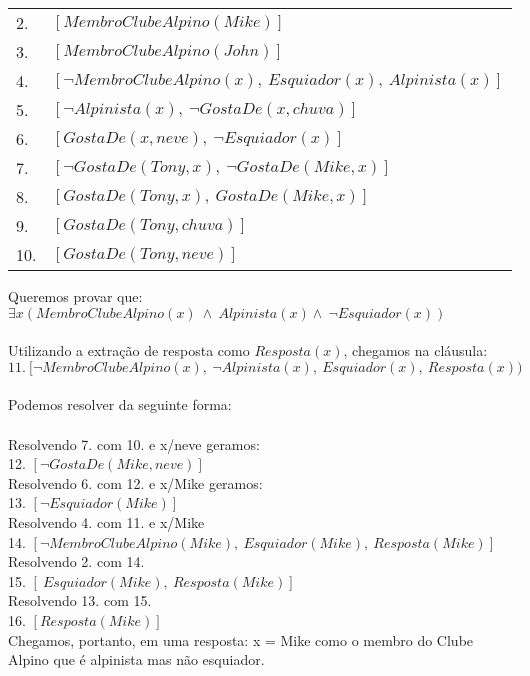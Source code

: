 \documentclass[12pt]{article}
\begin{document}
\begin{itemize}
\begin{itemize}
\begin{center}
\begin{tabular}{l|l}
						2. & $[MembroClubeAlpino(Mike)]$\\
						3. & $[MembroClubeAlpino(John)]$\\
						4. & $[\neg MembroClubeAlpino(x), \ Esquiador(x), \ Alpinista(x)] $ \\
						5. & $[\neg Alpinista(x), \ \neg GostaDe(x, chuva)] $\\
						6. & $[GostaDe(x, neve), \  \neg Esquiador(x)]$\\
						7. & $[\neg GostaDe(Tony, x), \  \neg GostaDe(Mike, x)]$\\
						8. & $[GostaDe(Tony, x), \  GostaDe(Mike, x)]$\\
						9. & $[GostaDe(Tony, chuva)]$\\
						10. & $[GostaDe(Tony, neve)]$\\			
					\end{tabular}
				\end{center}
				Queremos provar que:\\
				$\exists x (MembroClubeAlpino(x) \ \wedge \ Alpinista(x) \wedge \  
				\neg Esquiador(x))$\\ \\
				Utilizando a extração de resposta como $Resposta(x)$, chegamos na cláusula:\\
				$11. \ [\neg MembroClubeAlpino(x), \  \neg Alpinista(x),  \ Esquiador(x),
				\ Resposta(x))$\\ \\
			Podemos resolver da seguinte forma:\\ \\
			 Resolvendo 7. com 10. e x/neve geramos:\\
			12. $[\neg GostaDe(Mike, neve)]$\\
	
			Resolvendo 6. com 12. e x/Mike geramos:\\
			13. $[\neg Esquiador(Mike)]$\\
			
			Resolvendo 4. com 11. e x/Mike\\
			14. $ [\neg MembroClubeAlpino(Mike),  \ Esquiador(Mike), \ Resposta(Mike)]$\\
			
			Resolvendo 2. com 14.\\
			15. $ [\ Esquiador(Mike), \ Resposta(Mike)]$\\
			
			Resolvendo 13. com 15.\\
			16. $ [Resposta(Mike)]$\\

			Chegamos, portanto, em uma resposta: x = Mike como o
			membro do Clube Alpino que é alpinista mas não esquiador.
			\end{itemize}
	\end{itemize}
\end{document}
